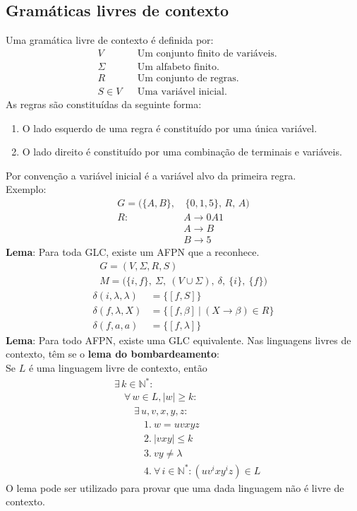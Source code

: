 \documentclass[11pt]{article}
\begin{document}
\subsection{Gramáticas livres de contexto}
\label{sec:org6ee2bdc}
Uma gramática livre de contexto é definida por:
\begin{align*}
  & V && \text{Um conjunto finito de variáveis.} \\
  & \Sigma && \text{Um alfabeto finito.} \\
  & R && \text{Um conjunto de regras.} \\
  & S \in V && \text{Uma variável inicial.}
\end{align*}
As regras são constituídas da seguinte forma:
\begin{enumerate}
\item O lado esquerdo de uma regra é constituído por uma única variável.
\item O lado direito é constituído por uma combinação de terminais e variáveis.
\end{enumerate}
Por convenção a variável inicial é a variável alvo da primeira regra. \vspace{5pt} \\
Exemplo:
\begin{align*}
  G = \big(\{A, B\}, & \, \{0, 1, 5\},\, R,\, A \big) \\
  R: \quad & A \to 0A1 \\
           & A \to B \\
           & B \to 5
\end{align*}
\textbf{Lema}: Para toda GLC, existe um AFPN que a reconhece.
\begin{align*}
  & G = (V, \Sigma, R, S) & \\
  & M = \big( \{i, f\},\> \Sigma,\> (V \cup \Sigma),\> \delta,\> \{i\},\> \{f\} \big)
\end{align*}
\begin{align*}
  \delta(i, \lambda, \lambda) & = \big\{ [f, S] \big\} \\
  \delta(f, \lambda, X) & = \big\{ [f, \beta] \>\big|\> (X \to \beta) \in R \big\} \\
  \delta(f, a, a) & = \big\{ [f, \lambda] \big\}
\end{align*}
\textbf{Lema}: Para todo AFPN, existe uma GLC equivalente. \newpage
Nas linguagens livres de contexto, têm se o \textbf{lema do bombardeamento}: \\
Se \(L\) é uma linguagem livre de contexto, então
\begin{align*}
  & \exists\, k \in \mathbb{N}^*: \\
  & \quad \forall\, w \in L, |w| \geq k : \\
  & \quad\quad \exists\, u, v, x, y, z: \\
  & \quad\quad\quad 1.\> w = uvxyz \\
  & \quad\quad\quad 2.\> |vxy| \leq k \\
  & \quad\quad\quad 3.\> vy \neq \lambda \\
  & \quad\quad\quad 4.\> \forall\,i \in \mathbb{N}^*: \left(uv^ixy^iz\right) \in L
\end{align*}
O lema pode ser utilizado para provar que uma dada linguagem não é livre de contexto.
\end{document}
